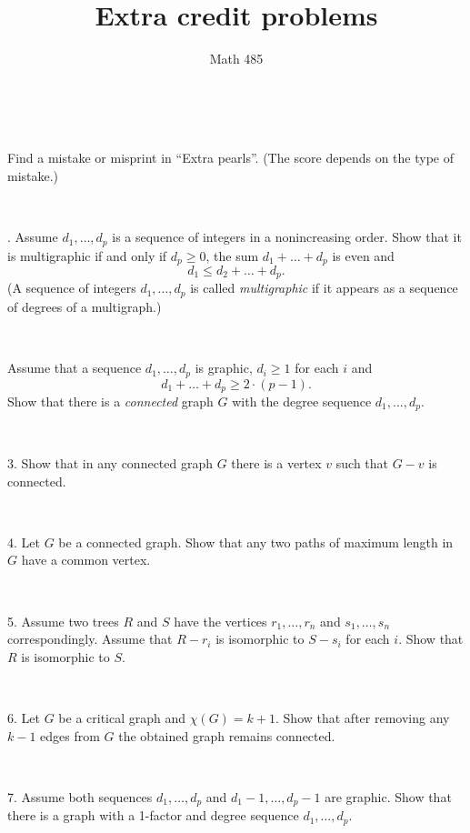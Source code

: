 \documentclass[oneside,a4paper]{article}
\begin{document}
%
\title{Extra credit problems}
\author{Math 485}
\date{}
\maketitle

\textit{}


\ 

 Find a mistake or misprint in ``Extra pearls''.
(The score depends on the type of mistake.)


\ 

.
Assume $d_1,\dots, d_p$ is a sequence of integers in a nonincreasing order.
Show that it is multigraphic if and only if $d_p\ge0$, the sum $d_1+\dots+ d_p$ is even and 
\[d_1\le d_2+\dots+d_p.\]
(A sequence of integers $d_1,\dots, d_p$ is called \textit{multigraphic} if it appears as a sequence of degrees of a multigraph.)

\ 

Assume that a sequence $d_1,\dots, d_p$ is graphic,
$d_i\ge 1$ for each $i$ and 
\[d_1+\dots+d_p\ge 2\cdot(p-1).\]
Show that there is a \textit{connected} graph $G$ with the degree sequence $d_1,\dots, d_p$.


\ 

\noindent 
{3.}
Show that in any connected graph $G$ there is a vertex $v$ such that $G-v$ is connected.

\ 


\noindent
{4.} 
Let $G$ be a  connected graph.
Show that any two paths of maximum length in $G$ have a common vertex.


\ 

\noindent %
{5.} %
Assume two trees $R$ and $S$ 
have the vertices $r_1,\dots,r_n$ and $s_1,\dots,s_n$ correspondingly.
Assume that $R-r_i$ is isomorphic to $S-s_i$ for each $i$.
Show that $R$ is isomorphic to $S$.

\ 

\noindent 
{6.} %
Let $G$ be a critical graph and $\chi(G)=k+1$.
Show that after removing any $k-1$ edges from $G$  
the obtained graph remains connected. 

\ 

\noindent %
{7.} %
Assume both sequences $d_1,\dots, d_p$
 and $d_1-1,\dots, d_p-1$ are graphic.
Show that there is a graph with a 1-factor and degree sequence $d_1,\dots, d_p$.


\ 
\end{document}
